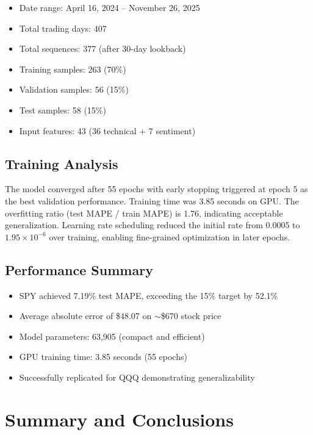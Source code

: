 \documentclass[12pt,letterpaper]{article}
\begin{document}
\begin{itemize}[noitemsep]
    \item Date range: April 16, 2024 -- November 26, 2025
    \item Total trading days: 407
    \item Total sequences: 377 (after 30-day lookback)
    \item Training samples: 263 (70\%)
    \item Validation samples: 56 (15\%)
    \item Test samples: 58 (15\%)
    \item Input features: 43 (36 technical + 7 sentiment)
\end{itemize}

\subsection{Training Analysis}

The model converged after 55 epochs with early stopping triggered at epoch 5 as the best validation performance. Training time was 3.85 seconds on GPU. The overfitting ratio (test MAPE / train MAPE) is 1.76, indicating acceptable generalization. Learning rate scheduling reduced the initial rate from 0.0005 to $1.95\times10^{-6}$ over training, enabling fine-grained optimization in later epochs.

\subsection{Performance Summary}

\begin{itemize}[noitemsep]
    \item SPY achieved 7.19\% test MAPE, exceeding the 15\% target by 52.1\%
    \item Average absolute error of \$48.07 on $\sim$\$670 stock price
    \item Model parameters: 63,905 (compact and efficient)
    \item GPU training time: 3.85 seconds (55 epochs)
    \item Successfully replicated for QQQ demonstrating generalizability
\end{itemize}

\section{Summary and Conclusions}
\end{document}
